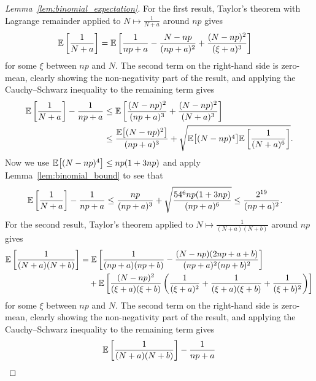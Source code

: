 \begin{proof}[Lemma~\ref{lem:binomial_expectation}]
  For the first result,
  Taylor's theorem with Lagrange remainder
  applied to $N \mapsto \frac{1}{N+a}$ around $n p$ gives
  \begin{align*}
    \mathbb{E} \left[
      \frac{1}{N+a}
    \right]
    &=
    \mathbb{E} \left[
      \frac{1}{n p+a}
      - \frac{N - n p}{(n p+a)^2}
      + \frac{(N - n p)^2}{(\xi+a)^3}
    \right]
  \end{align*}
  for some $\xi$ between $n p$ and $N$.
  The second term on the right-hand side is zero-mean,
  clearly showing the non-negativity part of the result,
  and applying the Cauchy--Schwarz inequality
  to the remaining term gives
  \begin{align*}
    \mathbb{E} \left[
      \frac{1}{N+a}
    \right]
    - \frac{1}{n p+a}
    &\leq
    \mathbb{E} \left[
      \frac{(N - n p)^2}{(n p+a)^3}
      + \frac{(N - n p)^2}{(N+a)^3}
    \right] \\
    &\leq
    \frac{\mathbb{E}\big[(N - n p)^2\big]}{(n p+a)^3}
    + \sqrt{
      \mathbb{E}\big[(N - n p)^4\big]
      \mathbb{E} \left[
        \frac{1}{(N+a)^6}
    \right]}.
  \end{align*}
  Now we use
  $\mathbb{E}\big[(N - n p)^4\big] \leq n p(1+3n p)$
  and apply Lemma~\ref{lem:binomial_bound} to see that
  \begin{align*}
    \mathbb{E} \left[
      \frac{1}{N+a}
    \right]
    - \frac{1}{n p+a}
    &\leq
    \frac{n p}{(n p+a)^3}
    + \sqrt{\frac{54^6 n p(1+3 n p)}{(n p + a)^6}}
    \leq
    \frac{2^{19}}{(n p+a)^2}.
  \end{align*}
  For the second result,
  Taylor's theorem applied to $N \mapsto \frac{1}{(N+a)(N+b)}$
  around $n p$ gives
  \begin{align*}
    \mathbb{E} \left[
      \frac{1}{(N+a)(N+b)}
    \right]
    &=
    \mathbb{E} \left[
      \frac{1}{(n p+a)(n p + b)}
      - \frac{(N - n p)(2 n p + a + b)}{(n p + a)^2 (n p + b)^2}
    \right] \\
    &\quad+
    \mathbb{E} \left[
      \frac{(N - n p)^2}{(\xi+a)(\xi+b)}
      \left(
        \frac{1}{(\xi + a)^2}
        + \frac{1}{(\xi + a)(\xi + b)}
        + \frac{1}{(\xi + b)^2}
      \right)
    \right]
  \end{align*}
  for some $\xi$ between $n p$ and $N$.
  The second term on the right-hand side is zero-mean,
  clearly showing the non-negativity part of the result,
  and applying the Cauchy--Schwarz inequality
  to the remaining term gives
  \begin{align*}
    &\E \left[
      \frac{1}{(N+a)(N+b)}
    \right]
    - \frac{1}{n p+a} \\

\end{align*}
\end{proof}
